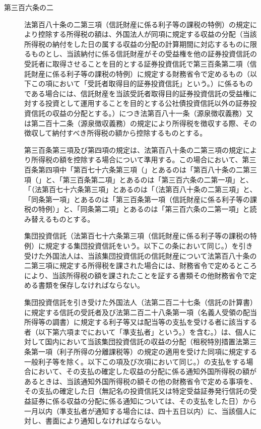 \documentclass[twocolumn,a4j,10pt]{ltjtarticle}
\begin{document}
\begin{description}
\item[第三百六条の二]法第百八十条の二第三項（信託財産に係る利子等の課税の特例）の規定により控除する所得税の額は、外国法人が同項に規定する収益の分配（当該所得税の納付をした日の属する収益の分配の計算期間に対応するものに限るものとし、当該納付に係る信託財産がその受益権を他の証券投資信託の受託者に取得させることを目的とする証券投資信託で第三百条第二項（信託財産に係る利子等の課税の特例）に規定する財務省令で定めるもの（以下この項において「受託者取得目的証券投資信託」という。）に係るものである場合には、信託財産を当該受託者取得目的証券投資信託の受益権に対する投資として運用することを目的とする公社債投資信託以外の証券投資信託の収益の分配とする。）につき法第百八十一条（源泉徴収義務）又は第二百十二条（源泉徴収義務）の規定により所得税を徴収する際、その徴収して納付すべき所得税の額から控除するものとする。
\item[]第三百条第三項及び第四項の規定は、法第百八十条の二第三項の規定により所得税の額を控除する場合について準用する。この場合において、第三百条第四項中「第百七十六条第三項（」とあるのは「第百八十条の二第三項（」と、「第三百条第二項」とあるのは「第三百六条の二第一項」と、「（法第百七十六条第三項」とあるのは「（法第百八十条の二第三項」と、「同条第一項」とあるのは「第三百条第一項（信託財産に係る利子等の課税の特例）」と、「同条第二項」とあるのは「第三百六条の二第一項」と読み替えるものとする。
\item[]集団投資信託（法第百七十六条第三項（信託財産に係る利子等の課税の特例）に規定する集団投資信託をいう。以下この条において同じ。）を引き受けた外国法人は、当該集団投資信託の信託財産について法第百八十条の二第三項に規定する所得税を課された場合には、財務省令で定めるところにより、当該所得税の額を課されたことを証する書類その他財務省令で定める書類を保存しなければならない。
\item[]集団投資信託を引き受けた外国法人（法第二百二十七条（信託の計算書）に規定する信託の受託者及び法第二百二十八条第一項（名義人受領の配当所得等の調書）に規定する利子等又は配当等の支払を受ける者に該当する者（以下第六項までにおいて「準支払者」という。）を含む。）は、個人に対して国内において当該集団投資信託の収益の分配（租税特別措置法第三条第一項（利子所得の分離課税等）の規定の適用を受けた同項に規定する一般利子等を除く。以下この項及び次項において同じ。）の支払をする場合において、その支払の確定した収益の分配に係る通知外国所得税の額があるときは、当該通知外国所得税の額その他の財務省令で定める事項を、その支払の確定した日（無記名の投資信託又は特定受益証券発行信託の受益証券に係る収益の分配に係る通知については、その支払をした日）から一月以内（準支払者が通知する場合には、四十五日以内）に、当該個人に対し、書面により通知しなければならない。

\end{description}
\end{document}

